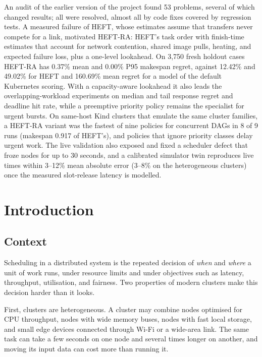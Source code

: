 \documentclass[12pt,a4paper]{report}
\begin{document}
An audit of the earlier version of the project found 53 problems, several
of which changed results; all were resolved, almost all by code fixes
covered by regression tests.
A measured failure of HEFT, whose estimates assume that transfers never
compete for a link, motivated HEFT-RA: HEFT's task order with
finish-time estimates that account for network contention, shared image
pulls, heating, and expected failure loss, plus a one-level lookahead. On
3,750 fresh holdout cases HEFT-RA has 0.37\% mean and 0.00\% P95
makespan regret, against 12.42\% and 49.02\% for HEFT and 160.69\% mean
regret for a model of the default Kubernetes scoring. With a
capacity-aware lookahead it also leads the overlapping-workload
experiments on median and tail response regret and deadline hit rate,
while a preemptive priority policy remains the specialist for urgent
bursts. On same-host Kind clusters that emulate the same cluster families,
a HEFT-RA variant was the fastest of nine policies for concurrent DAGs in
8 of 9 runs (makespan 0.917 of HEFT's), and policies that ignore priority
classes delay urgent work. The live validation also exposed and fixed a scheduler defect
that froze nodes for up to 30 seconds, and a calibrated simulator twin
reproduces live times within 3--12\% mean absolute error (3--8\% on the
heterogeneous clusters) once the measured slot-release latency is modelled.

\tableofcontents

\chapter{Introduction}
\label{ch:intro}

\section{Context}

Scheduling in a distributed system is the repeated decision of \emph{when}
and \emph{where} a unit of work runs, under resource limits and under
objectives such as latency, throughput, utilisation, and fairness. Two
properties of modern clusters make this decision harder than it looks.

First, clusters are heterogeneous. A cluster may combine nodes optimised
for CPU throughput, nodes with wide memory buses, nodes with fast local
storage, and small edge devices connected through Wi-Fi or a wide-area
link. The same task can take a few seconds on one node and several times
longer on another, and moving its input data can cost more than running it.
\end{document}
